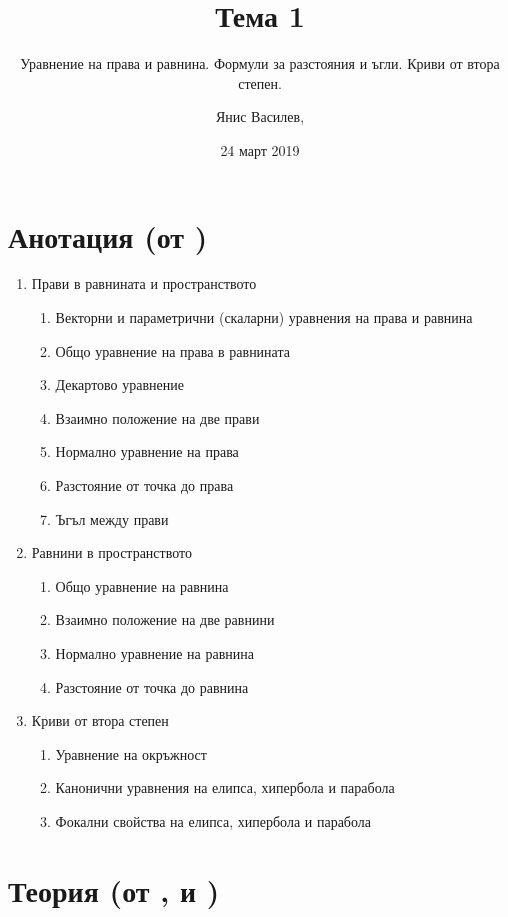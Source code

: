 \documentclass[numbers=endperiod]{scrartcl}
\title{Тема 1}
\subtitle{Уравнение на права и равнина. Формули за разстояния и ъгли. Криви от втора степен.}
\author{Янис Василев, \Email{ianis@ivasilev.net}}
\date{24 март 2019}
\begin{document}
\maketitle

\section{Анотация (от \cite{Syllabus})}

\begin{enumerate}
    \item Прави в равнината и пространството
    \begin{enumerate}
        \item Векторни и параметрични (скаларни) уравнения на права и равнина
        \item Общо уравнение на права в равнината
        \item Декартово уравнение
        \item Взаимно положение на две прави
        \item Нормално уравнение на права
        \item Разстояние от точка до права
        \item Ъгъл между прави
    \end{enumerate}

    \item Равнини в пространството
    \begin{enumerate}
        \item Общо уравнение на равнина
        \item Взаимно положение на две равнини
        \item Нормално уравнение на равнина
        \item Разстояние от точка до равнина
    \end{enumerate}

    \item Криви от втора степен
    \begin{enumerate}
        \item Уравнение на окръжност
        \item Канонични уравнения на елипса, хипербола и парабола
        \item Фокални свойства на елипса, хипербола и парабола
    \end{enumerate}
\end{enumerate}

\section{Теория (от \cite{Notes}, \cite{Donchev} и \cite{Stanilov})}
\end{document}
